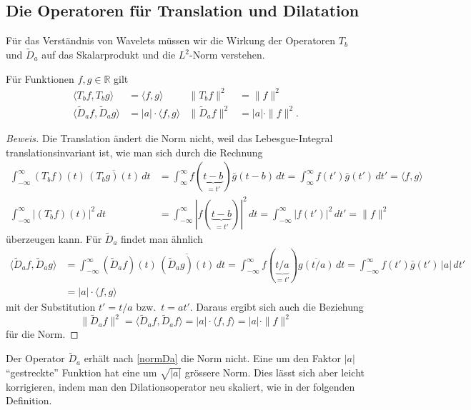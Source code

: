 \subsection{Die Operatoren für Translation und Dilatation
\label{subsection:translation-dilatation2}}
%
%
Für das Verständnis von Wavelets müssen wir die Wirkung der Operatoren
$T_b$ und $\tilde{D}_a$ auf das Skalarprodukt und die $L^2$-Norm verstehen.

\begin{satz}
Für Funktionen $f,g\in\mathbb R$ gilt
\begin{align}
&\qquad&
\langle T_bf,T_bg\rangle
&=
\langle f,g\rangle
&
\| T_bf\|^2 &= \|f\|^2
&\qquad&
\label{normTb}
\\
&&
\langle \tilde{D}_af,\tilde{D}_ag\rangle
&=
|a|\cdot
\langle f,g\rangle
&
\| \tilde{D}_af\|^2 &= |a|\cdot \|f\|^2.
&&
\label{normDa}
\end{align}
\end{satz}

\begin{proof}[Beweis]
Die Translation ändert die Norm nicht, weil das Lebesgue-Integral 
translationsinvariant ist, wie man sich durch die Rechnung
\begin{align*}
\int_{-\infty}^\infty (T_bf)(t)\,\overline{(T_bg)(t)}\,dt
&=
\int_{\infty}^\infty f(\underbrace{t-b}_{\displaystyle=t'})\bar{g}(t-b)\,dt
=
\int_{\infty}^\infty f(t')\bar{g}(t')\,dt'
=
\langle f,g\rangle
\\
\int_{-\infty}^\infty |(T_bf)(t)|^2\,dt
&=
\int_{-\infty}^\infty |f(\underbrace{t-b}_{\displaystyle=t'})|^2\,dt
=
\int_{-\infty}^\infty |f(t')|^2\,dt'
=
\|f\|^2
\end{align*}
überzeugen kann.
Für $\tilde{D}_a$ findet man ähnlich
\begin{align*}
\langle \tilde{D}_af,\tilde{D}_ag\rangle
&=
\int_{-\infty}^\infty (\tilde{D}_af)(t)\,\overline{(\tilde{D}_ag)(t)}\,dt
=
\int_{-\infty}^\infty
f(\underbrace{t/a}_{\displaystyle=t'})
\overline{g(t/a)}
\,dt
=
\int_{-\infty}^\infty f(t')\bar{g}(t')\,|a|\,dt'
\\
&=
|a|\cdot \langle f,g\rangle
\end{align*}
mit der Substitution $t'=t/a$ bzw.~$t=at'$.
Daraus ergibt sich auch die Beziehung
\[
\|\tilde{D}_af\|^2
=
\langle \tilde{D}_af,\tilde{D}_af\rangle
=
|a|\cdot \langle f,f\rangle
=
|a|\cdot \|f\|^2
\]
für die Norm.
\end{proof}

Der Operator $\tilde{D}_a$ erhält nach \eqref{normDa} die Norm nicht.
Eine um den Faktor $|a|$ ``gestreckte'' Funktion hat eine um $\sqrt{|a|}$
grössere Norm.
Dies lässt sich aber leicht korrigieren, indem man den Dilationsoperator
neu skaliert, wie in der folgenden Definition.

